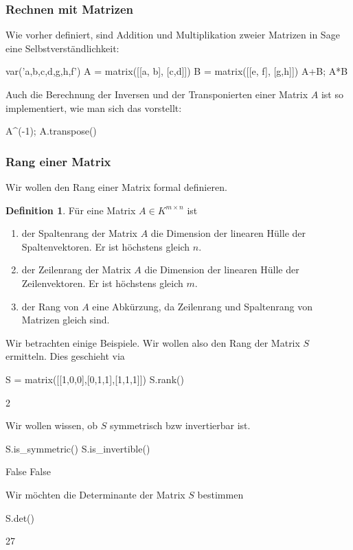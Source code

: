 \documentclass[fontsize=12pt,paper=a4,twoside,bibtotoc,idxtotoc,
liststotoc,pagesize,BCOR1.2cm,DIV15,chapterprefix,pagesize=pdftex]{scrbook}
\theoremstyle{plain}
\theoremstyle{definition}
\newtheorem{df}[equation]{Definition}
\theoremstyle{remark}
\begin{document}
\subsubsection{Rechnen mit Matrizen} 
Wie vorher definiert, sind Addition und Multiplikation zweier Matrizen in Sage eine Selbstverständlichkeit:
\begin{sagein}
var('a,b,c,d,g,h,f')
A = matrix([[a, b], [c,d]])
B = matrix([[e, f], [g,h]])
A+B; A*B
\end{sagein}
Auch die Berechnung der Inversen und der Transponierten einer Matrix $A$ ist so implementiert, wie man sich das vorstellt:
\begin{sagein}
A^(-1); A.transpose()
\end{sagein}
\subsubsection{Rang einer Matrix}
Wir wollen den Rang einer Matrix formal definieren.
\begin{df}
Für eine Matrix $A \in K^{m \times n}$ ist 
\begin{enumerate}
 \item der Spaltenrang der Matrix $A$ die Dimension der linearen Hülle der Spaltenvektoren. Er ist höchstens gleich $n$.
 \item der Zeilenrang der Matrix $A$ die Dimension der linearen Hülle der Zeilenvektoren. Er ist höchstens gleich $m$.
 \item der Rang von $A$ eine Abkürzung, da Zeilenrang und Spaltenrang von Matrizen gleich sind. 
\end{enumerate}
\end{df}
Wir betrachten einige Beispiele. Wir wollen also den Rang der Matrix $S$ ermitteln. Dies geschieht via
\begin{sagein}
S = matrix([[1,0,0],[0,1,1],[1,1,1]])
S.rank()
\end{sagein}
\begin{sage}
  2
\end{sage}
Wir wollen wissen, ob $S$ symmetrisch bzw invertierbar ist.
\begin{sagein}
S.is_symmetric() 
S.is_invertible()
\end{sagein}
\begin{sage}
False
False
\end{sage}
Wir möchten die Determinante der Matrix $S$ bestimmen
\begin{sagein}
S.det()
\end{sagein}
\begin{sage}
  27
\end{sage}
\end{document}

